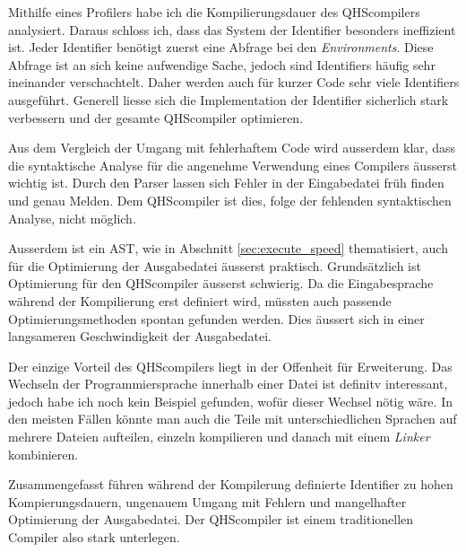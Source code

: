 Mithilfe eines Profilers habe ich die Kompilierungsdauer des QHScompilers analysiert. Daraus schloss ich, dass das System der Identifier besonders ineffizient ist. 
Jeder Identifier benötigt zuerst eine Abfrage bei den \textit{Environments}. Diese Abfrage ist an sich keine aufwendige Sache, jedoch sind Identifiers häufig sehr ineinander verschachtelt.
Daher werden auch für kurzer Code sehr viele Identifiers ausgeführt. Generell liesse sich die Implementation der Identifier sicherlich stark verbessern und der gesamte QHScompiler optimieren.

Aus dem Vergleich der Umgang mit fehlerhaftem Code wird ausserdem klar, dass die syntaktische Analyse für die angenehme Verwendung eines Compilers äusserst wichtig ist.
Durch den Parser lassen sich Fehler in der Eingabedatei früh finden und genau Melden. Dem QHScompiler ist dies, folge der fehlenden syntaktischen Analyse, nicht möglich.

Ausserdem ist ein AST, wie in Abschnitt \ref{sec:execute_speed} thematisiert, auch für die Optimierung der Ausgabedatei äusserst praktisch.
Grundsätzlich ist Optimierung für den QHScompiler äusserst schwierig. Da die Eingabesprache während der Kompilierung erst definiert wird, müssten auch passende Optimierungsmethoden spontan gefunden werden.
Dies äussert sich in einer langsameren Geschwindigkeit der Ausgabedatei.

Der einzige Vorteil des QHScompilers liegt in der Offenheit für Erweiterung.
Das Wechseln der Programmiersprache innerhalb einer Datei ist definitv interessant, jedoch habe ich noch kein Beispiel gefunden, wofür dieser Wechsel nötig wäre.
In den meisten Fällen könnte man auch die Teile mit unterschiedlichen Sprachen auf mehrere Dateien aufteilen, einzeln kompilieren und danach mit einem \textit{Linker} kombinieren.

Zusammengefasst führen während der Kompilerung definierte Identifier zu hohen Kompierungsdauern, ungenauem Umgang mit Fehlern und mangelhafter Optimierung der Ausgabedatei.
Der QHScompiler ist einem traditionellen Compiler also stark unterlegen.
